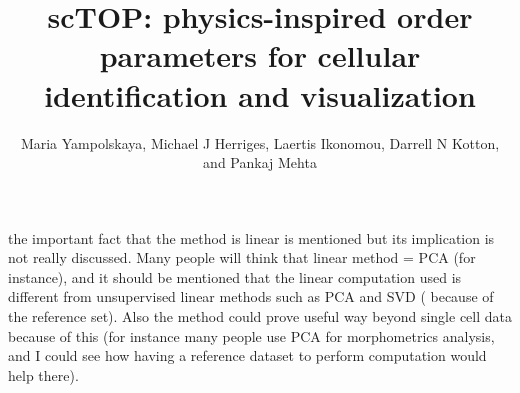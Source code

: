 \documentclass[12pt,american]{scrartcl}
\title{scTOP: physics-inspired order parameters for cellular identification and visualization}
\author{Maria Yampolskaya, Michael J Herriges, Laertis Ikonomou, Darrell N Kotton, and Pankaj Mehta}
\begin{document}

% 

\reviewer

\begin{revcomment}
	the important fact that the method is linear is mentioned but its implication is not really discussed. Many people will think that linear method = PCA (for instance), and it should be mentioned that the linear computation used is different from unsupervised linear methods such as PCA and SVD ( because of the reference set). Also the method could prove useful way beyond single cell data because of this (for instance many people use PCA for morphometrics analysis, and I could see how having a reference dataset to perform computation would help there).
\end{revcomment}
\end{document}
